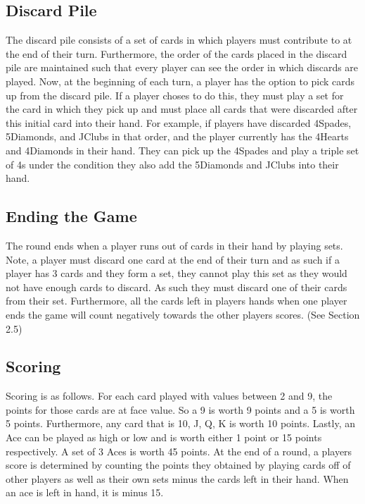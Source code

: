 \documentclass{article}
\begin{document}
\subsection{Discard Pile}
The discard pile consists of a set of cards in which players must contribute to at the end of their turn. Furthermore, the order of the cards placed in the discard pile are maintained such that every player can see the order in which discards are played. Now, at the beginning of each turn, a player has the option to pick cards up from the discard pile. If a player choses to do this, they must play a set for the card in which they pick up and must place all cards that were discarded after this initial card into their hand. For example, if players have discarded 4Spades, 5Diamonds, and JClubs in that order, and the player currently has the 4Hearts and 4Diamonds in their hand. They can pick up the 4Spades and play a triple set of 4s under the condition they also add the 5Diamonds and JClubs into their hand. 

\subsection{Ending the Game}
The round ends when a player runs out of cards in their hand by playing sets. Note, a player must discard one card at the end of their turn and as such if a player has 3 cards and they form a set, they cannot play this set as they would not have enough cards to discard. As such they must discard one of their cards from their set. Furthermore, all the cards left in players hands when one player ends the game will count negatively towards the other players scores. (See Section 2.5)

\subsection{Scoring}
Scoring is as follows. For each card played with values between 2 and 9, the points for those cards are at face value. So a 9 is worth 9 points and a 5 is worth 5 points. Furthermore, any card that is 10, J, Q, K is worth 10 points. Lastly, an Ace can be played as high or low and is worth either 1 point or 15 points respectively. A set of 3 Aces is worth 45 points. At the end of a round, a players score is determined by counting the points they obtained by playing cards off of other players as well as their own sets minus the cards left in their hand. When an ace is left in hand, it is minus 15. 
\end{document}
